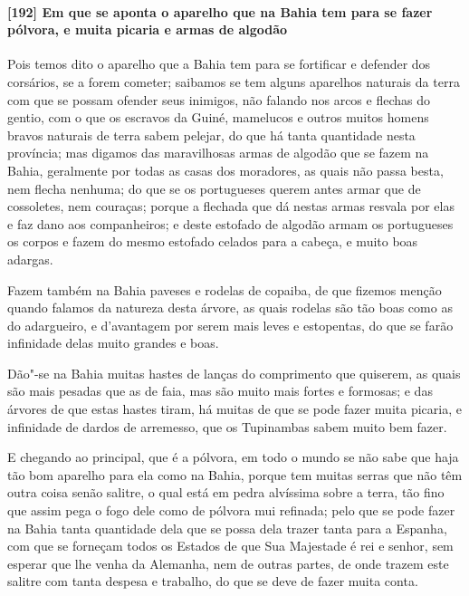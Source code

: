 \paragraph{[192] Em que se aponta o aparelho que na Bahia tem para se fazer pólvora, e muita
picaria e armas de algodão}\quad
Pois temos dito o aparelho que a Bahia tem para se fortificar e defender dos corsários, se
a forem cometer; saibamos se tem alguns aparelhos naturais da terra com que se possam
ofender seus inimigos, não falando nos arcos e flechas do gentio, com o que os escravos da
Guiné, mamelucos e outros muitos homens bravos naturais de terra sabem pelejar, do que há
tanta quantidade nesta província; mas digamos das maravilhosas armas de algodão que se
fazem na Bahia, geralmente por todas as casas dos moradores, as quais não passa besta, nem
flecha nenhuma; do que se os portugueses querem antes armar que de cossoletes, nem
couraças; porque a flechada que dá nestas armas resvala por elas e faz dano aos
companheiros; e deste estofado de algodão armam os portugueses os corpos e fazem do mesmo
estofado celados para a cabeça, e muito boas adargas.

Fazem também na Bahia paveses e rodelas de copaiba, de que fizemos menção quando falamos
da natureza desta árvore, as quais rodelas são tão boas como as do adargueiro, e
d'avantagem por serem mais leves e estopentas, do que se farão infinidade delas muito
grandes e boas.

Dão"-se na Bahia muitas hastes de lanças do comprimento que quiserem, as quais são mais
pesadas que as de faia, mas são muito mais fortes e formosas; e das árvores de que estas
hastes tiram, há muitas de que se pode fazer muita picaria, e infinidade de dardos de
arremesso, que os Tupinambas sabem muito bem fazer.

E chegando ao principal, que é a pólvora, em todo o mundo se não sabe que haja tão bom
aparelho para ela como na Bahia, porque tem muitas serras que não têm outra coisa senão
salitre, o qual está em pedra alvíssima sobre a terra, tão fino que assim pega o fogo dele
como de pólvora mui refinada; pelo que se pode fazer na Bahia tanta quantidade dela que se
possa dela trazer tanta para a Espanha, com que se forneçam todos os Estados de que Sua
Majestade é rei e senhor, sem esperar que lhe venha da Alemanha, nem de outras partes, de
onde trazem este salitre com tanta despesa e trabalho, do que se deve de fazer muita
conta.

